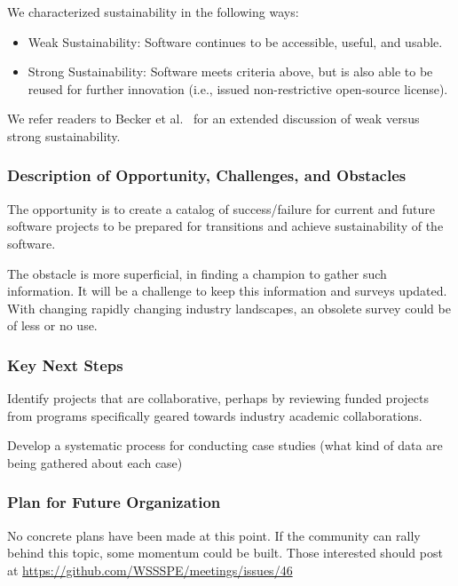 We characterized sustainability in the following ways:
\begin{itemize}

\item Weak Sustainability: Software continues to be accessible, useful, and
usable.

\item Strong Sustainability: Software meets criteria above, but is also able to
be reused for further innovation (i.e., issued non-restrictive open-source
license).

\end{itemize}
We refer readers to Becker et al.~\cite{Becker:2014} for an extended discussion
of weak versus strong sustainability.

\subsubsection{Description of Opportunity, Challenges, and Obstacles} 

The opportunity is to create a catalog of success/failure for current and future
software projects to be prepared for transitions and achieve sustainability of
the software.

The obstacle is more superficial, in finding a champion to gather such
information. It will be a challenge to keep this information and surveys
updated. With changing rapidly changing industry landscapes, an obsolete survey
could be of less or no use.

\subsubsection{Key Next Steps}

Identify projects that are collaborative, perhaps by reviewing funded projects
from programs specifically geared towards industry academic collaborations.

Develop a systematic process for conducting case studies (what kind of data are
being gathered about each case)

\subsubsection{Plan for Future Organization}

No concrete plans have been made at this point. If the community can rally
behind this topic, some momentum could be built. Those interested should post at
\url{https://github.com/WSSSPE/meetings/issues/46}

